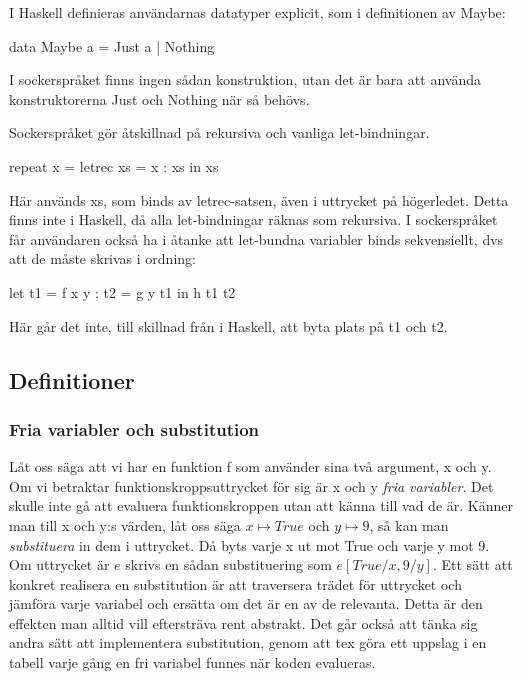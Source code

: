 \documentclass[Rapport]{subfiles}
\begin{document}
    I Haskell definieras användarnas datatyper explicit, som i definitionen
av Maybe:
\begin{codeEx}
data Maybe a = Just a | Nothing
\end{codeEx}
I sockerspråket finns ingen sådan konstruktion, utan det är bara att använda
konstruktorerna Just och Nothing när så behövs.


Sockerspråket gör åtskillnad på rekursiva och vanliga let-bindningar. 
\begin{codeEx}
repeat x = letrec xs = x : xs in xs  
\end{codeEx}
Här används xs, som binds av letrec-satsen, även i uttrycket på högerledet.
Detta finns inte i Haskell, då alla let-bindningar räknas som rekursiva. I
sockerspråket får användaren också ha i åtanke att let-bundna variabler binds
sekvensiellt, dvs att de måste skrivas i ordning:
\begin{codeEx}
let { t1 = f x y
    ; t2 = g y t1
    }
in  h t1 t2
\end{codeEx}
Här går det inte, till skillnad från i Haskell, att byta plats på t1 och t2.


\subsection{Definitioner}

\subsubsection{Fria variabler och substitution}
Låt oss säga att vi har en funktion f som använder sina två 
argument, x och y. Om vi betraktar funktionskroppsuttrycket för sig är x och y 
\emph{fria variabler}. Det skulle inte gå att evaluera funktionskroppen utan
att känna till vad de är. Känner man till x och y:s värden, låt oss säga
$x \mapsto True$ och $y \mapsto 9$, så kan man \emph{substituera} in dem i uttrycket. Då byts varje
x ut mot True och varje y mot 9. Om uttrycket är $e$ skrivs en sådan substituering som $e[True/x, 9/y]$. 
    Ett sätt att konkret realisera en substitution är att traversera trädet
för uttrycket och jämföra varje variabel och ersätta om det är en av de
relevanta. Detta är den effekten man alltid vill eftersträva rent abstrakt.
Det går också att tänka sig andra sätt att implementera substitution, genom
att tex göra ett uppslag i en tabell varje gång en fri variabel funnes när
koden evalueras. 
\end{document}
